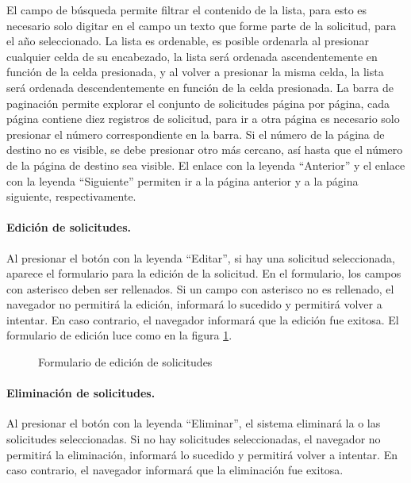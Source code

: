 \documentclass[a4paper, 9pt, conference]{article}              %
\begin{document}
El campo de b\'usqueda permite filtrar el contenido de la lista, para esto es necesario solo digitar en el campo un texto que forme parte de la solicitud, para el a\~no seleccionado. La lista es ordenable, es posible ordenarla al presionar cualquier celda de su encabezado, la lista ser\'a ordenada ascendentemente en funci\'on de la celda presionada, y al volver a presionar la misma celda, la lista ser\'a ordenada descendentemente en funci\'on de la celda presionada. La barra de paginaci\'on permite explorar el conjunto de solicitudes p\'agina por p\'agina, cada p\'agina contiene diez registros de solicitud, para ir a otra p\'agina es necesario solo presionar el n\'umero correspondiente en la barra. Si el n\'umero de la p\'agina de destino no es visible, se debe presionar otro m\'as cercano, as\'i hasta que el n\'umero de la p\'agina de destino sea visible. El enlace con la leyenda ``Anterior'' y el enlace con la leyenda ``Siguiente'' permiten ir a la p\'agina anterior y a la p\'agina siguiente, respectivamente.

\paragraph{Edici\'on de solicitudes.}

Al presionar el bot\'on con la leyenda ``Editar'', si hay una solicitud seleccionada, aparece el formulario para la edici\'on de la solicitud. En el formulario, los campos con asterisco deben ser rellenados. Si un campo con asterisco no es rellenado, el navegador no permitir\'a la edici\'on, informar\'a lo sucedido y permitir\'a volver a intentar. En caso contrario, el navegador informar\'a que la edici\'on fue exitosa. El formulario de edici\'on luce como en la figura \ref{fig:inforequestsedit}.

\begin{figure}
	\centering
		\caption{Formulario de edici\'on de solicitudes}
	\label{fig:inforequestsedit}
\end{figure}

\paragraph{Eliminaci\'on de solicitudes.}

Al presionar el bot\'on con la leyenda ``Eliminar'', el sistema eliminar\'a la o las solicitudes seleccionadas. Si no hay solicitudes seleccionadas, el navegador no permitir\'a la eliminaci\'on, informar\'a lo sucedido y permitir\'a volver a intentar. En caso contrario, el navegador informar\'a que la eliminaci\'on fue exitosa.


\end{document}
